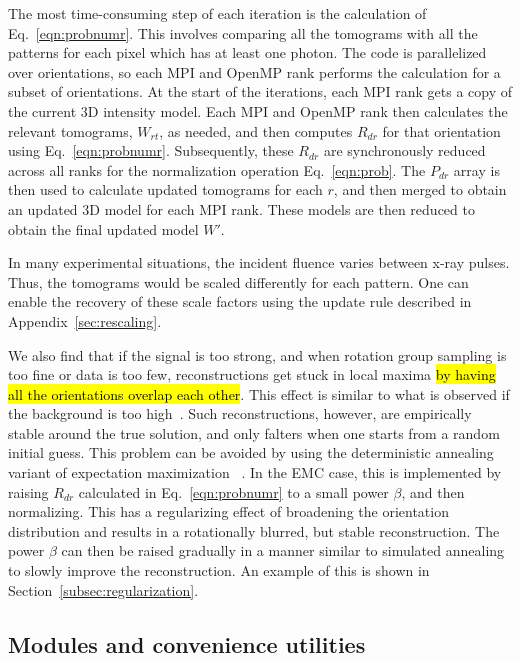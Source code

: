 \documentclass[preprint]{iucr}              %
\begin{document}
The most time-consuming step of each iteration is the calculation of Eq.~\ref{eqn:probnumr}. This involves comparing all the tomograms with all the patterns for each pixel which has at least one photon. The code is parallelized over orientations, so each MPI and OpenMP rank performs the calculation for a subset of orientations. At the start of the iterations, each MPI rank gets a copy of the current 3D intensity model. Each MPI and OpenMP rank then calculates the relevant tomograms, $W_{rt}$, as needed, and then computes $R_{dr}$ for that orientation using Eq.~\ref{eqn:probnumr}. Subsequently, these $R_{dr}$ are synchronously reduced across all ranks for the normalization operation Eq.~\ref{eqn:prob}. The $P_{dr}$ array is then used to calculate updated tomograms for each $r$, and then merged to obtain an updated 3D model for each MPI rank. These models are then reduced to obtain the final updated model $W'$.

In many experimental situations, the incident fluence varies between x-ray pulses. Thus, the tomograms would be scaled differently for each pattern. One can enable the recovery of these scale factors using the update rule described in Appendix~\ref{sec:rescaling}. 

We also find that if the signal is too strong, and when rotation group sampling is too fine or data is too few, reconstructions get stuck in local maxima \hl{by having all the orientations overlap each other}. This effect is similar to what is observed if the background is too high~\cite{ayyer2015}. Such reconstructions, however, are empirically stable around the true solution, and only falters when one starts from a random initial guess. This problem can be avoided by using the deterministic annealing variant of expectation maximization ~\cite{ueda1998}. In the EMC case, this is implemented by raising $R_{dr}$ calculated in Eq.~\ref{eqn:probnumr} to a small power $\beta$, and then normalizing. This has a regularizing effect of broadening the orientation distribution and results in a rotationally blurred, but stable reconstruction. The power $\beta$ can then be raised gradually in a manner similar to simulated annealing to slowly improve the reconstruction. An example of this is shown in Section~\ref{subsec:regularization}.

\subsection{Modules and convenience utilities}\label{subsec:mod+utils}
\end{document}

